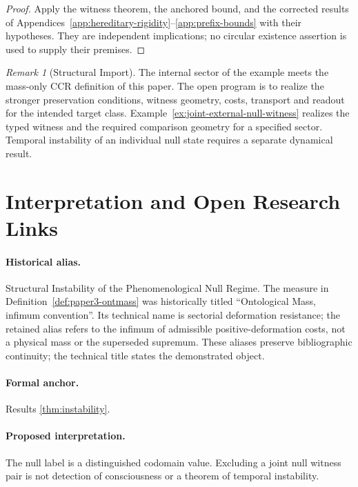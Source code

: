 \documentclass[11pt,a4paper]{article}
\theoremstyle{plain}
\theoremstyle{definition}
\theoremstyle{remark}
\newtheorem{remark}[theorem]{Remark}
\begin{document}
\begin{proof}
Apply the witness theorem, the anchored bound, and the corrected results of Appendices~\ref{app:hereditary-rigidity}--\ref{app:prefix-bounds} with their hypotheses. They are independent implications; no circular existence assertion is used to supply their premises.
\end{proof}

\begin{remark}[Structural Import]
The internal sector of the example meets the mass-only CCR definition of this paper. The open program is to realize the stronger preservation conditions, witness geometry, costs, transport and readout for the intended target class. Example~\ref{ex:joint-external-null-witness} realizes the typed witness and the required comparison geometry for a specified sector. Temporal instability of an individual null state requires a separate dynamical result.
\end{remark}

\nocite{paper1,paper2,ribes,lind,bowen,maclane1998,cover2006,tononi2004,chalmers}
\section{Interpretation and Open Research Links}\label{sec:interpretation-open-links}
\paragraph{Historical alias.} Structural Instability of the Phenomenological Null Regime. The measure in Definition~\ref{def:paper3-ontmass} was historically titled ``Ontological Mass, infimum convention''. Its technical name is sectorial deformation resistance; the retained alias refers to the infimum of admissible positive-deformation costs, not a physical mass or the superseded supremum. These aliases preserve bibliographic continuity; the technical title states the demonstrated object.

\paragraph{Formal anchor.} Results \ref{thm:instability}.

\paragraph{Proposed interpretation.} The null label is a distinguished codomain value. Excluding a joint null witness pair is not detection of consciousness or a theorem of temporal instability.
\end{document}

